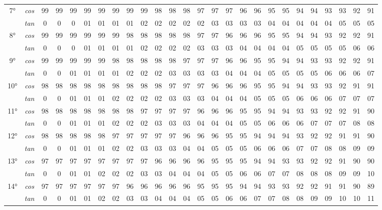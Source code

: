 \begin{tiny}
\begin{longtable}{c c |c |c |c |c |c |c |c |c |c |c |c |c |c |c |c |c |c |c |c |c |c |c |c |c}
		\multirow{2}{*}{7°}&\textit{cos}& 99& 99& 99& 99& 99& 99& 99& 99& 98& 98& 98& 97& 97& 97& 96& 96& 95& 95& 94& 94& 93& 93& 92& 91\\* \space&\textit{tan} & 0 & 0 & 0 & 01 & 01 & 01 & 01 & 02 & 02 & 02 & 02 & 02 & 03 & 03 & 03 & 03 & 04 & 04 & 04 & 04 & 04 & 05 & 05 & 05\\\hline
		\multirow{2}{*}{8°}&\textit{cos}& 99& 99& 99& 99& 99& 99& 98& 98& 98& 98& 98& 97& 97& 96& 96& 96& 95& 95& 94& 94& 93& 92& 92& 91\\* \space&\textit{tan} & 0 & 0 & 0 & 01 & 01 & 01 & 01 & 02 & 02 & 02 & 02 & 03 & 03 & 03 & 04 & 04 & 04 & 04 & 05 & 05 & 05 & 05 & 06 & 06\\\hline
		\multirow{2}{*}{9°}&\textit{cos}& 99& 99& 99& 99& 99& 98& 98& 98& 98& 98& 97& 97& 97& 96& 96& 95& 95& 94& 94& 93& 93& 92& 92& 91\\* \space&\textit{tan} & 0 & 0 & 01 & 01 & 01 & 01 & 02 & 02 & 02 & 03 & 03 & 03 & 03 & 04 & 04 & 04 & 05 & 05 & 05 & 05 & 06 & 06 & 06 & 07\\\hline
		\multirow{2}{*}{10°}&\textit{cos}& 98& 98& 98& 98& 98& 98& 98& 98& 98& 97& 97& 97& 96& 96& 96& 95& 95& 94& 94& 93& 93& 92& 91& 91\\* \space&\textit{tan} & 0 & 0 & 01 & 01 & 01 & 02 & 02 & 02 & 02 & 03 & 03 & 03 & 04 & 04 & 04 & 05 & 05 & 05 & 06 & 06 & 06 & 07 & 07 & 07\\\hline
		\multirow{2}{*}{11°}&\textit{cos}& 98& 98& 98& 98& 98& 98& 98& 97& 97& 97& 97& 96& 96& 96& 95& 95& 94& 94& 93& 93& 92& 92& 91& 90\\* \space&\textit{tan} & 0 & 0 & 01 & 01 & 01 & 02 & 02 & 02 & 03 & 03 & 03 & 04 & 04 & 04 & 05 & 05 & 06 & 06 & 06 & 07 & 07 & 07 & 08 & 08\\\hline
		\multirow{2}{*}{12°}&\textit{cos}& 98& 98& 98& 98& 98& 97& 97& 97& 97& 97& 96& 96& 96& 95& 95& 94& 94& 94& 93& 92& 92& 91& 91& 90\\* \space&\textit{tan} & 0 & 0 & 01 & 01 & 01 & 02 & 02 & 03 & 03 & 03 & 04 & 04 & 05 & 05 & 05 & 06 & 06 & 06 & 07 & 07 & 08 & 08 & 09 & 09\\\hline
		\multirow{2}{*}{13°}&\textit{cos}& 97& 97& 97& 97& 97& 97& 97& 97& 96& 96& 96& 96& 95& 95& 95& 94& 94& 93& 93& 92& 92& 91& 90& 90\\* \space&\textit{tan} & 0 & 0 & 01 & 01 & 02 & 02 & 02 & 03 & 03 & 04 & 04 & 04 & 05 & 05 & 06 & 06 & 07 & 07 & 08 & 08 & 08 & 09 & 09& 10\\\hline
		\multirow{2}{*}{14°}&\textit{cos}& 97& 97& 97& 97& 97& 97& 96& 96& 96& 96& 96& 95& 95& 95& 94& 94& 93& 93& 92& 92& 91& 91& 90& 89\\* \space&\textit{tan} & 0 & 0 & 01 & 01 & 02 & 02 & 03 & 03 & 04 & 04 & 04 & 05 & 05 & 06 & 06 & 07 & 07 & 08 & 08 & 09 & 09& 10& 10& 11\\\hline

\end{longtable}
\end{tiny}
